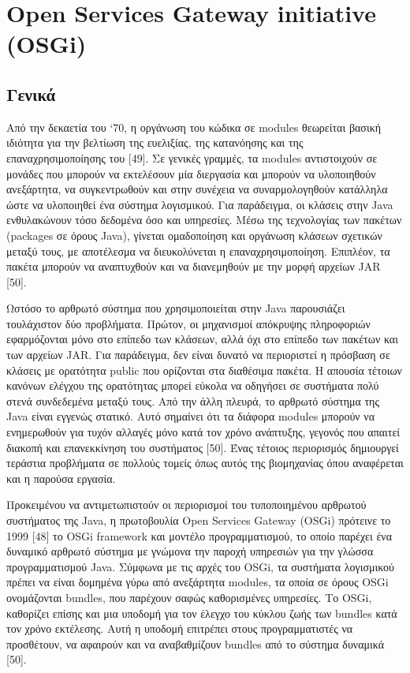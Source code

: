 \section{Open Services Gateway initiative (OSGi)}
\subsection{Γενικά}
Από την δεκαετία του ‘70, η οργάνωση του κώδικα σε modules θεωρείται βασική ιδιότητα για την βελτίωση της ευελιξίας, της κατανόησης και της επαναχρησιμοποίησης του [49]. Σε γενικές γραμμές, τα modules αντιστοιχούν σε μονάδες που μπορούν να εκτελέσουν μία διεργασία και μπορούν να υλοποιηθούν ανεξάρτητα, να συγκεντρωθούν και στην συνέχεια να συναρμολογηθούν κατάλληλα ώστε να υλοποιηθεί ένα σύστημα λογισμικού. Για παράδειγμα, οι κλάσεις στην Java ενθυλακώνουν τόσο δεδομένα όσο και υπηρεσίες. Μέσω της τεχνολογίας των πακέτων (packages σε όρους Java), γίνεται ομαδοποίηση και οργάνωση κλάσεων σχετικών μεταξύ τους, με αποτέλεσμα να διευκολύνεται η επαναχρησιμοποίηση. Επιπλέον, τα πακέτα μπορούν να αναπτυχθούν και να διανεμηθούν με την μορφή αρχείων JAR [50]. 

	Ωστόσο το αρθρωτό σύστημα που χρησιμοποιείται στην Java παρουσιάζει τουλάχιστον δύο προβλήματα. Πρώτον, οι μηχανισμοί απόκρυψης πληροφοριών εφαρμόζονται μόνο στο επίπεδο των κλάσεων, αλλά όχι στο επίπεδο των πακέτων και των αρχείων JAR. Για παράδειγμα, δεν είναι δυνατό να περιοριστεί η πρόσβαση σε κλάσεις με ορατότητα public που ορίζονται στα διαθέσιμα πακέτα. Η απουσία τέτοιων κανόνων ελέγχου της ορατότητας μπορεί εύκολα να οδηγήσει σε συστήματα πολύ στενά συνδεδεμένα μεταξύ τους. Από την άλλη πλευρά, το αρθρωτό σύστημα της Java είναι εγγενώς στατικό. Αυτό σημαίνει ότι τα διάφορα modules μπορούν να ενημερωθούν για τυχόν αλλαγές μόνο κατά τον χρόνο ανάπτυξης, γεγονός που απαιτεί διακοπή και επανεκκίνηση του συστήματος [50]. Ένας τέτοιος περιορισμός δημιουργεί τεράστια προβλήματα σε πολλούς τομείς όπως αυτός της βιομηχανίας όπου αναφέρεται και η παρούσα εργασία. 

	Προκειμένου να αντιμετωπιστούν οι περιορισμοί του τυποποιημένου αρθρωτού συστήματος της Java, η πρωτοβουλία  Open Services Gateway (OSGi) πρότεινε το 1999 [48] το  OSGi framework και μοντέλο προγραμματισμού, το οποίο παρέχει ένα δυναμικό αρθρωτό σύστημα με γνώμονα την παροχή υπηρεσιών για την γλώσσα προγραμματισμού Java. Σύμφωνα με τις αρχές του OSGi, τα συστήματα λογισμικού πρέπει να είναι δομημένα γύρω από ανεξάρτητα modules, τα οποία σε όρους OSGi ονομάζονται bundles, που παρέχουν σαφώς καθορισμένες υπηρεσίες. Το OSGi, καθορίζει επίσης και μια υποδομή για τον έλεγχο του κύκλου ζωής των bundles κατά τον χρόνο εκτέλεσης. Αυτή η υποδομή επιτρέπει στους προγραμματιστές να  προσθέτουν, να αφαιρούν και να αναβαθμίζουν bundles από το σύστημα δυναμικά [50]. 
	

